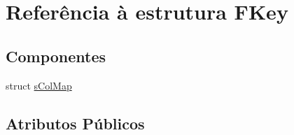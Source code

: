 \hypertarget{struct_f_key}{\section{Referência à estrutura F\-Key}
\label{struct_f_key}
}
\subsection*{Componentes}
\begin{DoxyCompactItemize}
\item 
struct \hyperlink{struct_f_key_1_1s_col_map}{s\-Col\-Map}
\end{DoxyCompactItemize}
\subsection*{Atributos Públicos}

